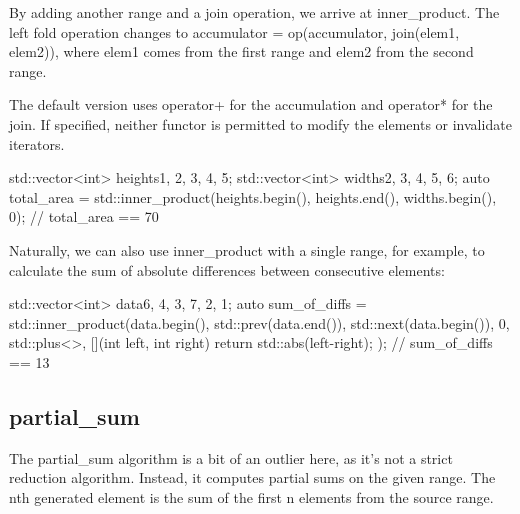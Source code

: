 By adding another range and a join operation, we arrive at inner\_product. The left fold operation changes to accumulator = op(accumulator, join(elem1, elem2)), where elem1 comes from the first range and elem2 from the second range.



The default version uses operator+ for the accumulation and operator* for the join. If specified, neither functor is permitted to modify the elements or invalidate iterators.

\begin{box-note}
\begin{cppcode}
std::vector<int> heights{1, 2, 3, 4, 5};
std::vector<int> widths{2, 3, 4, 5, 6};
auto total_area = std::inner_product(heights.begin(), heights.end(), widths.begin(), 0);
// total_area == 70
\end{cppcode}
\end{box-note}

Naturally, we can also use inner\_product with a single range, for example, to calculate the sum of absolute differences between consecutive elements:

\begin{box-note}
\begin{cppcode}
std::vector<int> data{6, 4, 3, 7, 2, 1};
auto sum_of_diffs = std::inner_product(data.begin(), std::prev(data.end()), 
                                       std::next(data.begin()), 
                                       0, std::plus<>{}, 
                                       [](int left, int right) { return std::abs(left-right); });
// sum_of_diffs == 13
\end{cppcode}
\end{box-note}

\subsection{partial\_sum}

The partial\_sum algorithm is a bit of an outlier here, as it’s not a strict reduction algorithm. Instead, it computes partial sums on the given range. The nth generated element is the sum of the first n elements from the source range.



